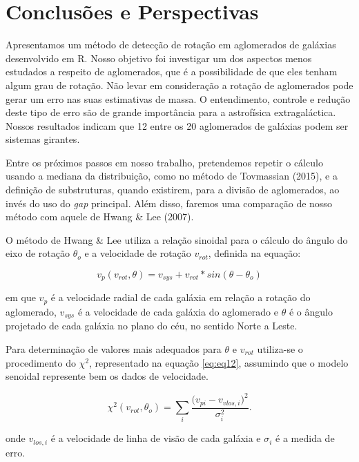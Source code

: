 \documentclass[12pt,fleqn]{article}
\begin{document}
{\section{Conclusões e Perspectivas}

Apresentamos um método de detecção de rotação em aglomerados de galáxias desenvolvido em R.
Nosso objetivo foi investigar um dos aspectos menos estudados a respeito de aglomerados, que é a possibilidade de que eles tenham algum grau de rotação. Não levar em consideração a rotação de aglomerados pode gerar um erro nas suas estimativas de massa. O entendimento, controle e redução deste tipo de erro são de grande importância para a astrofísica extragaláctica. Nossos resultados indicam que
12 entre os 20 aglomerados de galáxias podem ser sistemas girantes.

Entre os próximos passos em nosso trabalho, pretendemos repetir o cálculo usando a mediana da distribuição, como no método de
Tovmassian (2015), e a definição de substruturas, quando existirem, para a divisão de aglomerados, ao invés do uso do {\it gap} principal. Além disso, faremos uma comparação de nosso método com aquele de Hwang \& Lee (2007).

O método de Hwang \& Lee utiliza a relação sinoidal para o cálculo do ângulo do eixo de rotação $\theta_o$ e a velocidade de rotação $v_{rot}$, definida na equação:

\begin{equation}
v_p(v_{rot}, \theta) = v_{sys} + v_{rot} * sin(\theta - \theta_o)
\label{eq:eq11}
\end{equation}

\noindent em que $v_p$ é a velocidade radial de cada galáxia em relação a rotação do aglomerado, $v_{sys}$ é a velocidade de cada galáxia do aglomerado e $\theta$ é o ângulo projetado de cada galáxia no plano do céu, no sentido Norte a Leste.  

Para determinação de valores mais adequados para $\theta$ e $v_{rot}$ utiliza-se o procedimento do $\chi^2$, representado na equação \ref{eq:eq12}, assumindo que o modelo senoidal represente bem os dados de velocidade.

\begin{equation}
\chi^2 (v_{rot}, \theta_o) = \sum_i \frac{({v_{pi} - v_{vlos,i})}^2}{\sigma^{2}_i}.
\label{eq:eq12}
\end{equation}

\noindent onde $v_{los,i}$ é a velocidade de linha de visão de cada galáxia e $\sigma_i$ é a medida de erro.

}
\end{document}

